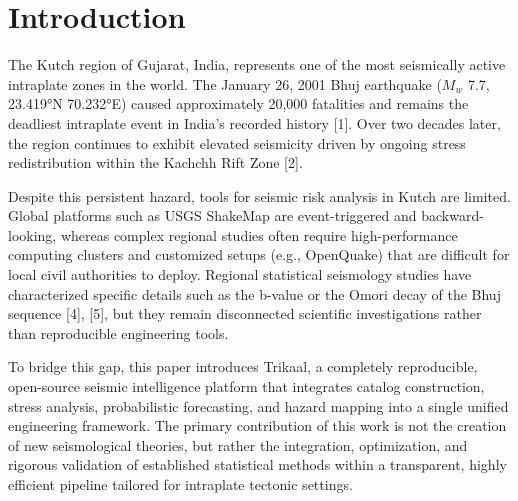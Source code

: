 \documentclass[journal]{IEEEtran}
\begin{document}
\section{Introduction}

The Kutch region of Gujarat, India, represents one of the most seismically active intraplate zones in the world. The January 26, 2001 Bhuj earthquake ($M_w$ 7.7, 23.419°N 70.232°E) caused approximately 20,000 fatalities and remains the deadliest intraplate event in India's recorded history [1]. Over two decades later, the region continues to exhibit elevated seismicity driven by ongoing stress redistribution within the Kachchh Rift Zone [2].

Despite this persistent hazard, tools for seismic risk analysis in Kutch are limited. Global platforms such as USGS ShakeMap are event-triggered and backward-looking, whereas complex regional studies often require high-performance computing clusters and customized setups (e.g., OpenQuake) that are difficult for local civil authorities to deploy. Regional statistical seismology studies have characterized specific details such as the b-value or the Omori decay of the Bhuj sequence [4], [5], but they remain disconnected scientific investigations rather than reproducible engineering tools. 

To bridge this gap, this paper introduces Trikaal, a completely reproducible, open-source seismic intelligence platform that integrates catalog construction, stress analysis, probabilistic forecasting, and hazard mapping into a single unified engineering framework. The primary contribution of this work is not the creation of new seismological theories, but rather the integration, optimization, and rigorous validation of established statistical methods within a transparent, highly efficient pipeline tailored for intraplate tectonic settings.
\end{document}

